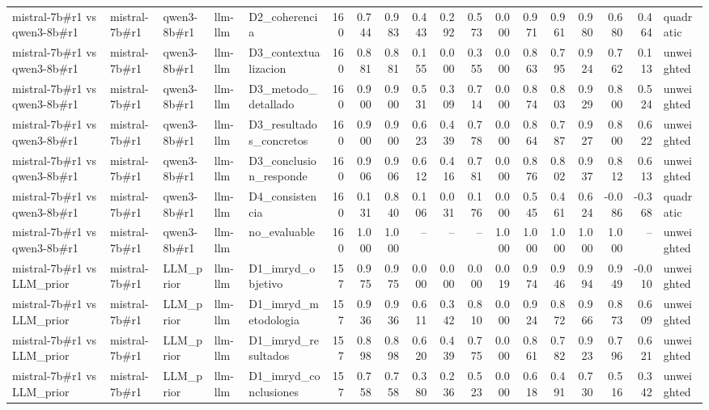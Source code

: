 \begin{table}
{\begin{tabular}{lllllrrrrrrrrrrrrl}
mistral-7b\#r1 vs qwen3-8b\#r1 & mistral-7b\#r1 & qwen3-8b\#r1 & llm-llm & D2\_coherencia & 160 & 0.744 & 0.983 & 0.443 & 0.292 & 0.573 & 0.000 & 0.971 & 0.961 & 0.980 & 0.680 & 0.464 & quadratic \\
mistral-7b\#r1 vs qwen3-8b\#r1 & mistral-7b\#r1 & qwen3-8b\#r1 & llm-llm & D3\_contextualizacion & 160 & 0.881 & 0.881 & 0.155 & 0.000 & 0.355 & 0.000 & 0.863 & 0.795 & 0.924 & 0.762 & 0.113 & unweighted \\
mistral-7b\#r1 vs qwen3-8b\#r1 & mistral-7b\#r1 & qwen3-8b\#r1 & llm-llm & D3\_metodo\_detallado & 160 & 0.900 & 0.900 & 0.531 & 0.309 & 0.714 & 0.000 & 0.874 & 0.803 & 0.929 & 0.800 & 0.524 & unweighted \\
mistral-7b\#r1 vs qwen3-8b\#r1 & mistral-7b\#r1 & qwen3-8b\#r1 & llm-llm & D3\_resultados\_concretos & 160 & 0.900 & 0.900 & 0.623 & 0.439 & 0.778 & 0.000 & 0.864 & 0.787 & 0.927 & 0.800 & 0.622 & unweighted \\
mistral-7b\#r1 vs qwen3-8b\#r1 & mistral-7b\#r1 & qwen3-8b\#r1 & llm-llm & D3\_conclusion\_responde & 160 & 0.906 & 0.906 & 0.612 & 0.416 & 0.781 & 0.000 & 0.876 & 0.802 & 0.937 & 0.812 & 0.613 & unweighted \\
mistral-7b\#r1 vs qwen3-8b\#r1 & mistral-7b\#r1 & qwen3-8b\#r1 & llm-llm & D4\_consistencia & 160 & 0.131 & 0.840 & 0.106 & 0.031 & 0.176 & 0.000 & 0.545 & 0.461 & 0.624 & -0.086 & -0.368 & quadratic \\
mistral-7b\#r1 vs qwen3-8b\#r1 & mistral-7b\#r1 & qwen3-8b\#r1 & llm-llm & no\_evaluable & 160 & 1.000 & 1.000 & -- & -- & -- & 1.000 & 1.000 & 1.000 & 1.000 & 1.000 & -- & unweighted \\
mistral-7b\#r1 vs LLM\_prior & mistral-7b\#r1 & LLM\_prior & llm-llm & D1\_imryd\_objetivo & 157 & 0.975 & 0.975 & 0.000 & 0.000 & 0.000 & 0.019 & 0.974 & 0.946 & 0.994 & 0.949 & -0.010 & unweighted \\
mistral-7b\#r1 vs LLM\_prior & mistral-7b\#r1 & LLM\_prior & llm-llm & D1\_imryd\_metodologia & 157 & 0.936 & 0.936 & 0.611 & 0.342 & 0.810 & 0.000 & 0.924 & 0.872 & 0.966 & 0.873 & 0.609 & unweighted \\
mistral-7b\#r1 vs LLM\_prior & mistral-7b\#r1 & LLM\_prior & llm-llm & D1\_imryd\_resultados & 157 & 0.898 & 0.898 & 0.620 & 0.439 & 0.775 & 0.000 & 0.861 & 0.782 & 0.923 & 0.796 & 0.621 & unweighted \\
mistral-7b\#r1 vs LLM\_prior & mistral-7b\#r1 & LLM\_prior & llm-llm & D1\_imryd\_conclusiones & 157 & 0.758 & 0.758 & 0.380 & 0.236 & 0.523 & 0.000 & 0.618 & 0.491 & 0.730 & 0.516 & 0.342 & unweighted \\

\end{tabular}}
\end{table}
